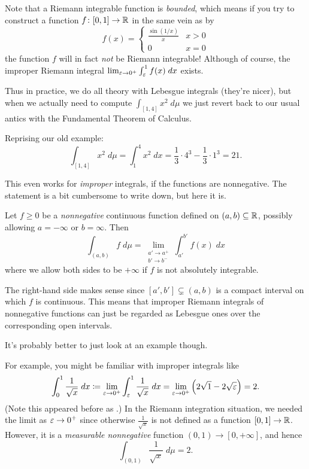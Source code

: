 Note that a Riemann integrable function is \emph{bounded},
which means if you try to construct a function $f \colon [0, 1] \to \mathbb R$
in the same vein as  by
\[
	f(x) = \begin{cases}
		\frac{\sin(1/x)}{x} & x > 0 \\
		0 & x = 0
	\end{cases}
\]
the function $f$ will in fact \emph{not} be Riemann integrable!
Although of course, the improper Riemann integral $\lim_{\varepsilon \to 0^+} \int_\varepsilon^1 f(x) \; dx$ exists.

Thus in practice, we do all theory with Lebesgue integrals (they're nicer),
but when we actually need to compute $\int_{[1,4]} x^2 \; d\mu$
we just revert back to our usual antics with the
Fundamental Theorem of Calculus.
\begin{example}
	Reprising our old example:
	\[ \int_{[1,4]} x^2 \; d\mu
		= \int_1^4 x^2 \; dx
		= \frac13 \cdot 4^3 - \frac13 \cdot 1^3 = 21.  \]
\end{example}

This even works for \emph{improper} integrals,
if the functions are nonnegative.
The statement is a bit cumbersome to write down, but here it is.
\begin{theorem}
	Let $f \ge 0$ be a \emph{nonnegative}
	continuous function defined on $(a,b) \subseteq \mathbb R$,
	possibly allowing $a = -\infty$ or $b = \infty$.
	Then
	\[ \int_{(a,b)} f \; d\mu
		= \lim_{\substack{a' \to a^+ \\ b' \to b^-}}
		\int_{a'}^{b'} f(x) \; dx \]
	where we allow both sides to be $+\infty$
	if $f$ is not absolutely integrable.
\end{theorem}
The right-hand side makes sense since $[a',b'] \subsetneq (a,b)$
is a compact interval on which $f$ is continuous.
This means that improper Riemann integrals of nonnegative
functions can just be regarded as Lebesgue ones
over the corresponding open intervals.

It's probably better to just look at an example though.
\begin{example}
	For example, you might be familiar with improper integrals like
	\[ \int_0^1 \frac{1}{\sqrt x} \; dx
		\coloneqq \lim_{\varepsilon \to 0^+}
		\int_\varepsilon^1 \frac{1}{\sqrt x} \; dx
		= \lim_{\varepsilon \to 0^+} \left( 2\sqrt{1} - 2\sqrt{\varepsilon} \right) = 2.
	\]
	(Note this appeared before as .)
	In the Riemann integration situation, we needed the limit as $\varepsilon \to 0^+$
	since otherwise $\frac{1}{\sqrt x}$ is not defined as a function $[0,1] \to \mathbb R$.
	However, it is a \emph{measurable nonnegative}
	function $(0,1) \to [0,+\infty]$, and hence
	\[ \int_{(0,1)} \frac{1}{\sqrt x} \; d\mu = 2. \]
\end{example}

